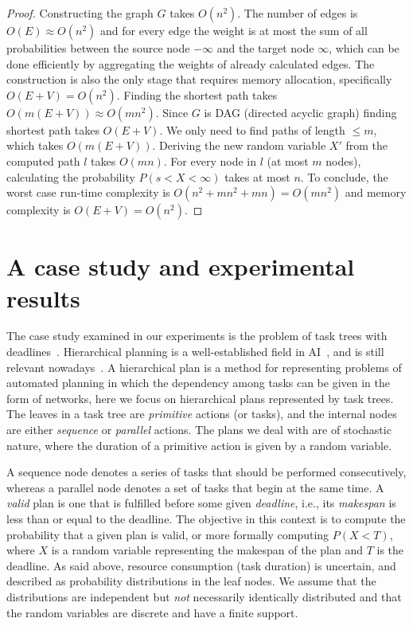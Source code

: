 \documentclass{article}
\begin{document}
\begin{proof}
	Constructing the graph $G$ takes $O(n^2)$. The number of edges is $O(E)\approx O(n^2)$ and for every edge the weight is at most the sum of all probabilities between the source node $-\infty$ and the target node $\infty$, which can be done efficiently by aggregating the weights of already calculated edges. 
	The construction is also the only stage that requires memory allocation, specifically $O(E+V)=O(n^2)$.
	Finding the shortest path takes $O(m(E+V))\approx O(mn^2)$. Since $G$ is DAG (directed acyclic graph) finding shortest path takes $O(E+V)$. We only need to find paths of length $\leq m$, which takes $O(m(E+V))$.
	Deriving the new random variable $X'$ from the computed path $l$ takes $O(mn)$. For every node in $l$ (at most $m$ nodes), calculating the probability $P(s<X<\infty)$ takes at most $n$. 
	To conclude, the worst case run-time complexity is $O(n^2+mn^2+mn)=O(mn^2)$ and memory complexity is $O(E+V)=O(n^2)$.
\end{proof}



\section{A case study and experimental results}\label{sec:exp}
The case study examined in our experiments is the problem of task trees with deadlines~\cite{cohen2015estimating,CohenGW18}. Hierarchical planning is a well-established field in AI~\cite{thomas1988hierarchical,erol1994htn,erol1996complexity}, and is still relevant nowadays~\cite{alford2016hierarchical,xiao2017hierarchical}. A hierarchical plan is a method for representing problems of automated planning in which the dependency among tasks can be given in the form of networks, here we focus on hierarchical plans represented by task trees. The leaves in a task tree are \emph{primitive} actions (or tasks), and the internal nodes are either \emph{sequence} or \emph{parallel} actions. The plans we deal with are of stochastic nature, where the duration of a primitive action is given by a random variable. 


A sequence node denotes a series of tasks that should be performed consecutively, whereas a parallel node denotes a set of tasks that begin at the same time. A \emph{valid} plan is one that is fulfilled before some given \emph{deadline}, i.e., its \emph{makespan} is less than or equal to the deadline. The objective in this context is to compute the probability that a given plan is valid, or more formally computing $P(X<T)$, where $X$ is a random variable representing the makespan of the plan and $T$ is the deadline. As said above, resource consumption (task duration) is uncertain, and described as probability distributions in the leaf nodes.
We assume that the distributions are independent but {\em not} necessarily identically distributed and that the random variables are discrete and have a finite support. 
\end{document}
